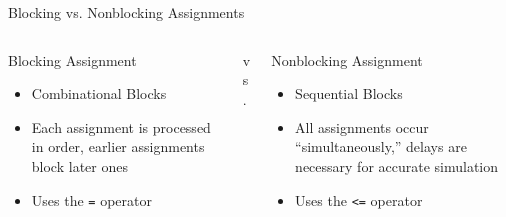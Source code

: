 \documentclass[table,dvipsnames,colorlinks=true]{beamer}
\begin{document}
\begin{frame}{Blocking vs. Nonblocking Assignments}
    \begin{columns}
        \begin{column}[T]{0.45\textwidth}
            \begin{block}{Blocking Assignment}
                \begin{itemize}
                    \item Combinational Blocks
                    \item Each assignment is processed in order, earlier
                        assignments block later ones
                    \item Uses the \texttt{=} operator
                \end{itemize}
            \end{block}
        \end{column}
        \begin{column}[T]{0.05\textwidth}
            \vspace*{0.25\textheight}
            \Large{vs.}
            \normalsize
        \end{column}
        \begin{column}[T]{0.45\textwidth}
            \begin{block}{Nonblocking Assignment}
                \begin{itemize}
                    \item Sequential Blocks
                    \item All assignments occur ``simultaneously,'' delays are
                        necessary for accurate simulation
                    \item Uses the \texttt{<=} operator
                \end{itemize}
            \end{block}
        \end{column}
    \end{columns}
\end{frame}
\end{document}
